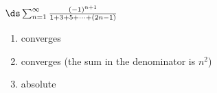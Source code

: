 {$\ds \sum_{n=1}^\infty \frac{(-1)^{n+1}}{1+3+5+\cdots+(2n-1) }$
}
{\begin{enumerate}
	\item converges
	\item	converges (the sum in the denominator is $n^2$)
	\item absolute
\end{enumerate}
}